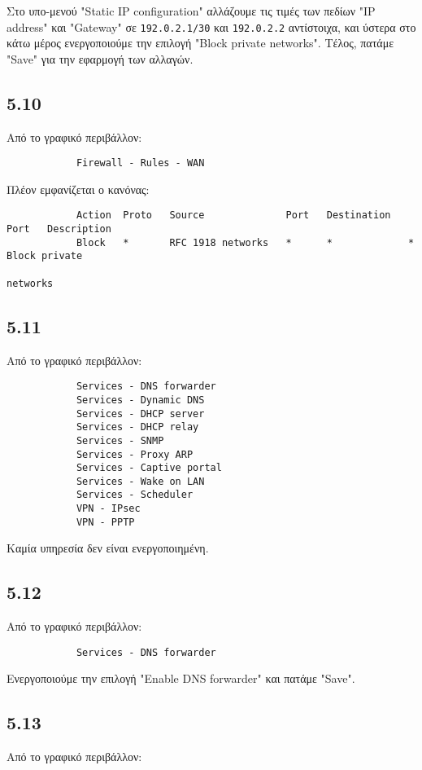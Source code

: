 \documentclass[a4paper, 12pt]{article}
\begin{document}
		Στο υπο-μενού "Static IP configuration" αλλάζουμε τις τιμές των πεδίων "IP address" και "Gateway" σε \verb|192.0.2.1/30| και \verb|192.0.2.2| αντίστοιχα, και ύστερα στο κάτω μέρος ενεργοποιούμε την επιλογή "Block private networks". Τέλος, πατάμε "Save" για την εφαρμογή των αλλαγών.

	\subsection*{5.10}
		Από το γραφικό περιβάλλον:
		
		\begin{verbatim}
			Firewall - Rules - WAN
		\end{verbatim}
		
		Πλέον εμφανίζεται ο κανόνας:
		
		\begin{verbatim}
			Action  Proto   Source              Port   Destination   Port   Description
			Block   *       RFC 1918 networks   *      *             *      Block private 
			                                                                networks
		\end{verbatim}

	\subsection*{5.11}
		Από το γραφικό περιβάλλον:
		
		\begin{verbatim}
			Services - DNS forwarder
			Services - Dynamic DNS
			Services - DHCP server
			Services - DHCP relay
			Services - SNMP
			Services - Proxy ARP
			Services - Captive portal
			Services - Wake on LAN
			Services - Scheduler
			VPN - IPsec
			VPN - PPTP
		\end{verbatim}
		
		Καμία υπηρεσία δεν είναι ενεργοποιημένη.

	\subsection*{5.12}
		Από το γραφικό περιβάλλον:
		
		\begin{verbatim}
			Services - DNS forwarder 
		\end{verbatim}
		
		Ενεργοποιούμε την επιλογή "Enable DNS forwarder" και πατάμε "Save".

	\subsection*{5.13}
		Από το γραφικό περιβάλλον:
		
\end{document}
